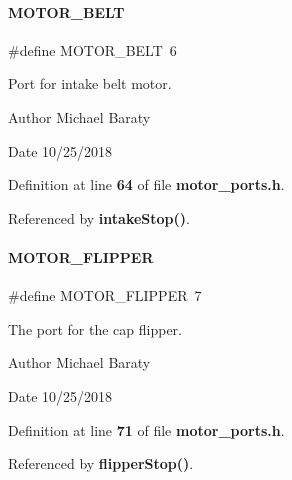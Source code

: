 \paragraph{M\+O\+T\+O\+R\+\_\+\+B\+E\+LT}
{\footnotesize\ttfamily \#define M\+O\+T\+O\+R\+\_\+\+B\+E\+LT~6}



Port for intake belt motor. 

\begin{DoxyAuthor}{Author}
Michael Baraty 
\end{DoxyAuthor}
\begin{DoxyDate}{Date}
10/25/2018 
\end{DoxyDate}


Definition at line \textbf{ 64} of file \textbf{ motor\+\_\+ports.\+h}.



Referenced by \textbf{ intake\+Stop()}.

\mbox{\label{motor__ports_8h_a403dc780867333fdcfcae4be6a0f5cce}} 
\paragraph{M\+O\+T\+O\+R\+\_\+\+F\+L\+I\+P\+P\+ER}
{\footnotesize\ttfamily \#define M\+O\+T\+O\+R\+\_\+\+F\+L\+I\+P\+P\+ER~7}



The port for the cap flipper. 

\begin{DoxyAuthor}{Author}
Michael Baraty 
\end{DoxyAuthor}
\begin{DoxyDate}{Date}
10/25/2018 
\end{DoxyDate}


Definition at line \textbf{ 71} of file \textbf{ motor\+\_\+ports.\+h}.



Referenced by \textbf{ flipper\+Stop()}.

\mbox{\label{motor__ports_8h_a2ab748678c046dca3c279ad60974b73d}} 
